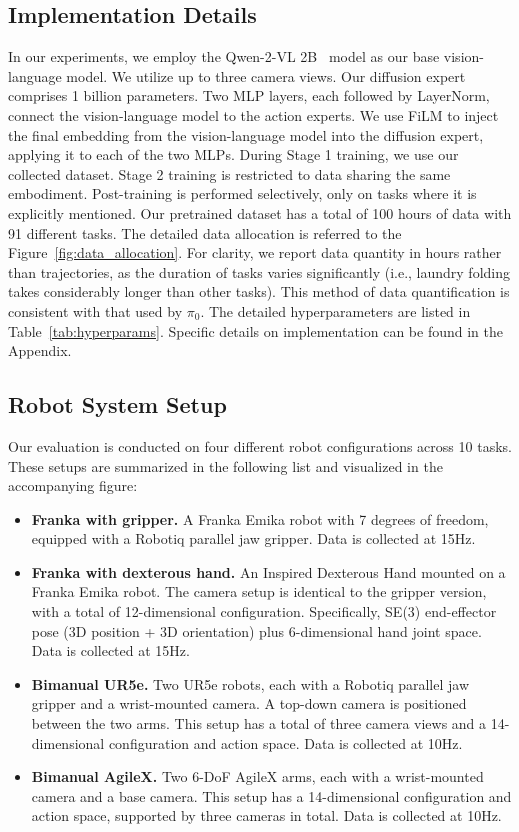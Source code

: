 \subsection{Implementation Details}
In our experiments, we employ the Qwen-2-VL 2B~\cite{wang2024qwen2} model as our base vision-language model. We utilize up to three camera views. Our diffusion expert comprises 1 billion parameters. Two MLP layers, each followed by LayerNorm, connect the vision-language model to the action experts. We use FiLM to inject the final embedding from the vision-language model into the diffusion expert, applying it to each of the two MLPs. During Stage 1 training, we use our collected dataset. Stage 2 training is restricted to data sharing the same embodiment. Post-training is performed selectively, only on tasks where it is explicitly mentioned. Our pretrained dataset has a total of 100 hours of data with 91 different tasks. The detailed data allocation is referred to the Figure~\ref{fig:data_allocation}. For clarity, we report data quantity in hours rather than trajectories, as the duration of tasks varies significantly (i.e., laundry folding takes considerably longer than other tasks). This method of data quantification is consistent with that used by $\pi_{0}$. The detailed hyperparameters are listed in Table~\ref{tab:hyperparams}. Specific details on implementation can be found in the Appendix. 



\subsection{Robot System Setup}

Our evaluation is conducted on four different robot configurations across 10 tasks. These setups are summarized in the following list and visualized in the accompanying figure:

\begin{itemize} 
\item \textbf{Franka with gripper.} A Franka Emika robot with 7 degrees of freedom, equipped with a Robotiq parallel jaw gripper. Data is collected at 15Hz. 
\item \textbf{Franka with dexterous hand.} An Inspired Dexterous Hand mounted on a Franka Emika robot. The camera setup is identical to the gripper version, with a total of 12-dimensional configuration. Specifically, SE(3) end-effector pose (3D position + 3D orientation)
plus 6-dimensional hand joint space. Data is collected at 15Hz. 
\item \textbf{Bimanual UR5e.} Two UR5e robots, each with a Robotiq parallel jaw gripper and a wrist-mounted camera. A top-down camera is positioned between the two arms. This setup has a total of three camera views and a 14-dimensional configuration and action space. Data is collected at 10Hz. 
\item \textbf{Bimanual AgileX.} Two 6-DoF AgileX arms, each with a wrist-mounted camera and a base camera. This setup has a 14-dimensional configuration and action space, supported by three cameras in total. Data is collected at 10Hz. 
\end{itemize}




